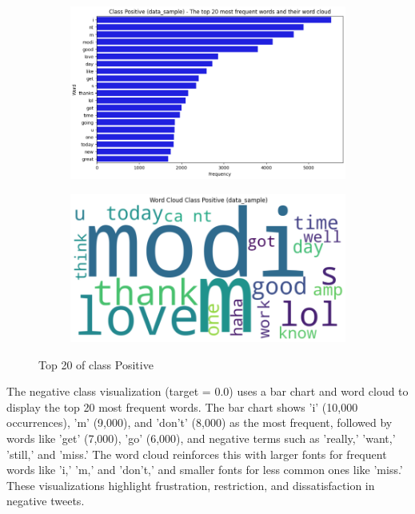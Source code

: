 \begin{figure}[H]
    \centering
    \begin{subfigure}[b]{0.48\textwidth}
        \includegraphics[width=\textwidth]{img/visualize_pic/top20_posi.png}
    \end{subfigure}
    \begin{subfigure}[b]{0.48\textwidth}
        \includegraphics[width=\textwidth]{img/visualize_pic/posi_wordcloud.png}
    \end{subfigure}
    \caption{Top 20 of class Positive}
\end{figure}

The negative class visualization (target = 0.0) uses a bar chart and word cloud to display the top 20 most frequent words. The bar chart shows 'i' (10,000 occurrences), 'm' (9,000), and 'don’t' (8,000) as the most frequent, followed by words like 'get' (7,000), 'go' (6,000), and negative terms such as 'really,' 'want,' 'still,' and 'miss.' The word cloud reinforces this with larger fonts for frequent words like 'i,' 'm,' and 'don’t,' and smaller fonts for less common ones like 'miss.' These visualizations highlight frustration, restriction, and dissatisfaction in negative tweets.

